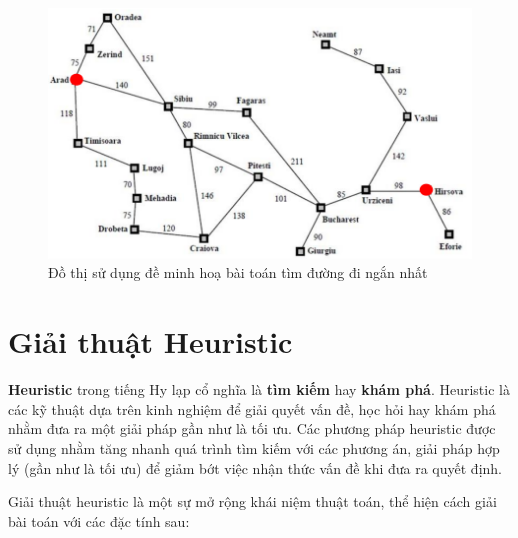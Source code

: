 \documentclass[a4paper, 11pt]{article}
\begin{document}
\begin{figure}[h]
  \centering
  \includegraphics[width=\textwidth,height=\textheight,keepaspectratio]{graph.png}
  \caption{Đồ thị sử dụng đề minh hoạ bài toán tìm đường đi ngắn nhất}
\end{figure}

\clearpage
\section{Giải thuật Heuristic}
\textbf{Heuristic} trong tiếng Hy lạp cổ nghĩa là \textbf{tìm kiếm} hay \textbf{khám phá}. Heuristic là các kỹ thuật dựa trên kinh nghiệm để giải quyết vấn đề, học hỏi hay khám phá nhằm đưa ra một giải pháp gần như là tối ưu. Các phương pháp heuristic được sử dụng nhằm tăng nhanh quá trình tìm kiếm với các phương án, giải pháp hợp lý (gần như là tối ưu) để giảm bớt việc nhận thức vấn đề khi đưa ra quyết định.

Giải thuật heuristic là một sự mở rộng khái niệm thuật toán, thể hiện cách giải bài toán với các đặc tính sau:
\end{document}
